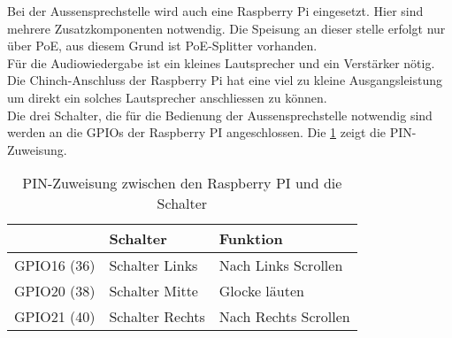 Bei der Aussensprechstelle wird auch eine Raspberry Pi eingesetzt. Hier sind mehrere Zusatzkomponenten notwendig. Die Speisung an dieser stelle erfolgt nur über PoE, aus diesem Grund ist PoE-Splitter vorhanden.
\\
Für die Audiowiedergabe ist ein kleines Lautsprecher und ein Verstärker nötig. Die Chinch-Anschluss der Raspberry Pi hat eine viel zu kleine Ausgangsleistung um direkt ein solches Lautsprecher anschliessen zu können. 
\\
Die drei Schalter, die für die Bedienung der Aussensprechstelle notwendig sind werden an die GPIOs der Raspberry PI angeschlossen. Die \cref{tbl:pinroutesdoor} zeigt die PIN-Zuweisung.
\begin{table}[]
	\centering
	\label{my-label}
	\begin{tabular}{l|ll}
		\multicolumn{1}{r|}{} \textbf{Pi GPIO (PIN)} & \textbf{Schalter} & \textbf{Funktion} \hspace{60pt}	\\ \hline
		GPIO16 (36)	&	Schalter Links		&	Nach Links Scrollen	\\ \hline
		GPIO20 (38)	&	Schalter Mitte		&	Glocke läuten		\\ \hline
		GPIO21 (40)	&	Schalter Rechts		&	Nach Rechts Scrollen		\\ \hline
	\end{tabular}
	\caption{PIN-Zuweisung zwischen den Raspberry PI und die Schalter}
	\label{tbl:pinroutesdoor}
\end{table}

